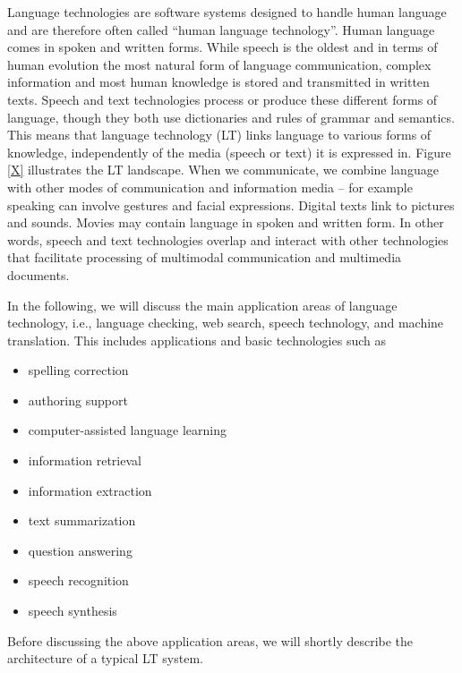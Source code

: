\documentclass[]{../../metanetpaper}
\begin{document}
\begin{multicols}{2}
Language technologies are software systems designed to handle
human language and are therefore often called “human language
technology”. Human language comes in spoken and written forms. While
speech is the oldest and in terms of human evolution the most natural
form of language communication, complex information and most human
knowledge is stored and transmitted in written texts. Speech and text
technologies process or produce these different forms of language,
though they both use dictionaries and rules of grammar and semantics.
This means that language technology (LT) links language to various
forms of knowledge, independently of the media (speech or text) it is
expressed in. Figure \ref{X} illustrates the LT
landscape. When we communicate, we combine language with other modes
of communication and information media – for example speaking can
involve gestures and facial expressions. Digital texts link to
pictures and sounds. Movies may contain language in spoken and written
form. In other words, speech and text technologies overlap and
interact with other technologies that facilitate processing of
multimodal communication and multimedia documents.

In the following, we will discuss the main application areas of
language technology, i.e., language checking, web search, speech
technology, and machine translation. This includes
applications and basic technologies such as
\begin{itemize}
\item spelling correction

\item authoring support

\item computer-assisted language learning

\item information retrieval

\item information extraction

\item text summarization

\item question answering

\item speech recognition

\item speech synthesis
\end{itemize}

Before discussing the above application areas, we will shortly
describe the architecture of a typical LT system.


\end{multicols}
\end{document}
